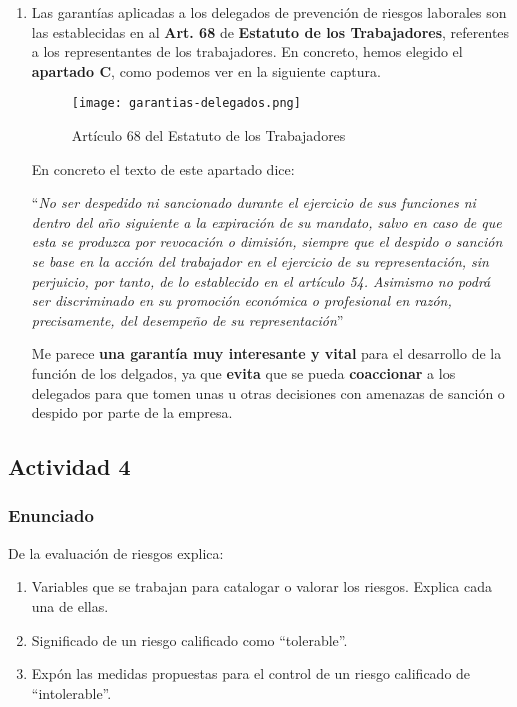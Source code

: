 \begin{enumerate}[label=\alph*.]
    \item Las garantías aplicadas a los delegados de prevención de riesgos laborales son las establecidas en al \textbf{Art. 68} de \textbf{Estatuto de los Trabajadores}, referentes a los representantes de los trabajadores. En concreto, hemos elegido  el \textbf{apartado C}, como podemos ver en la siguiente captura.

    \begin{figure}[H]
        \centering
        \texttt{[image: garantias-delegados.png]}
        \caption{Artículo 68 del Estatuto de los Trabajadores}
    \end{figure}

    En concreto el texto de este apartado dice:

    ``\textit{No ser despedido ni sancionado durante el ejercicio de sus funciones ni dentro del año siguiente a la expiración de su mandato, salvo en caso de que esta se produzca por revocación o dimisión, siempre que el despido o sanción se base en la acción del trabajador en el ejercicio de su representación, sin perjuicio, por tanto, de lo establecido en el artículo 54. Asimismo no podrá ser discriminado en su promoción económica o profesional en razón, precisamente, del desempeño de su representación}'' \cite{et01}

    Me parece \textbf{una garantía muy interesante y vital} para el desarrollo de la función de los delgados, ya que \textbf{evita} que se pueda \textbf{coaccionar} a los delegados para que tomen unas u otras decisiones con amenazas de sanción o despido por parte de la empresa.
\end{enumerate}

\subsection{Actividad 4}

\subsubsection{Enunciado}
De la evaluación de riesgos explica:
\begin{enumerate}
    \item Variables que se trabajan para catalogar o valorar los riesgos. Explica cada una de ellas.
    \item Significado de un riesgo calificado como ``tolerable''.
    \item Expón las medidas propuestas para el control de un riesgo calificado de ``intolerable''.
\end{enumerate}

